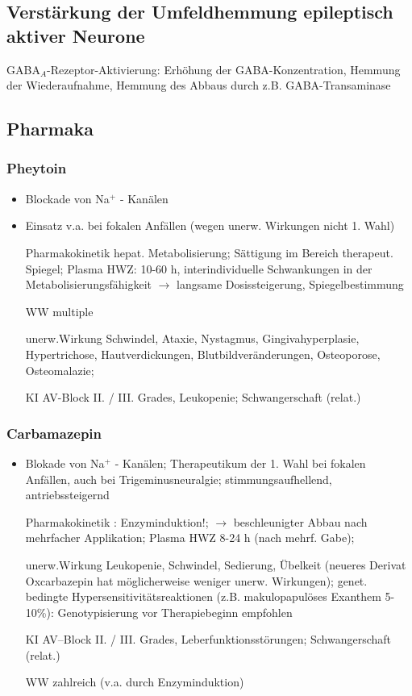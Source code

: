 \documentclass[10pt,a4paper]{report}
\begin{document}
\subsection{Verstärkung der Umfeldhemmung epileptisch aktiver Neurone} %
\label{sub:verst_rkung_der_umfeldhemmung_epileptisch_aktiver_neurone}
GABA$_A$-Rezeptor-Aktivierung: Erhöhung der GABA-Konzentration, Hemmung der Wiederaufnahme, Hemmung des Abbaus durch z.B. GABA-Transaminase
\subsection{Pharmaka} %
\label{sub:pharmaka}
\subsubsection{Pheytoin} %
\label{ssub:pheytoin}
\begin{itemize}
	\item Blockade von Na$^+$ - Kanälen
	\item Einsatz v.a. bei fokalen Anfällen (wegen unerw. Wirkungen 	nicht 1. Wahl)
	\item[Pharmakokinetik] hepat. Metabolisierung; Sättigung im Bereich therapeut. Spiegel; Plasma HWZ: 10-60 h, interindividuelle Schwankungen in der Metabolisierungsfähigkeit  $\rightarrow$ langsame Dosissteigerung, Spiegelbestimmung 
	\item[WW] multiple
	\item[unerw.Wirkung] Schwindel, Ataxie, Nystagmus, Gingivahyperplasie, Hypertrichose, Hautverdickungen, Blutbildveränderungen, Osteoporose, Osteomalazie; 
	\item[KI] AV-Block II. / III. Grades, Leukopenie; Schwangerschaft (relat.) 
\end{itemize}
\subsubsection{Carbamazepin} %
\label{ssub:carbamazepin}
\begin{itemize}
	\item Blokade von Na$^+$ - Kanälen; Therapeutikum der 1. Wahl bei fokalen Anfällen, auch bei Trigeminusneuralgie; stimmungsaufhellend, antriebssteigernd
	\item[Pharmakokinetik]: Enzyminduktion!; $\rightarrow$ beschleunigter Abbau nach mehrfacher Applikation; Plasma HWZ 8-24 h (nach mehrf. Gabe);
	\item[unerw.Wirkung] Leukopenie, Schwindel, Sedierung, Übelkeit (neueres Derivat Oxcarbazepin hat möglicherweise weniger unerw. Wirkungen); genet. bedingte Hypersensitivitätsreaktionen (z.B. makulopapulöses Exanthem 5-10\%): Genotypisierung vor Therapiebeginn empfohlen
	\item[KI] AV–Block II. / III. Grades, Leberfunktionsstörungen; Schwangerschaft (relat.)
	\item[WW] zahlreich (v.a. durch Enzyminduktion)
\end{itemize}
\end{document}
